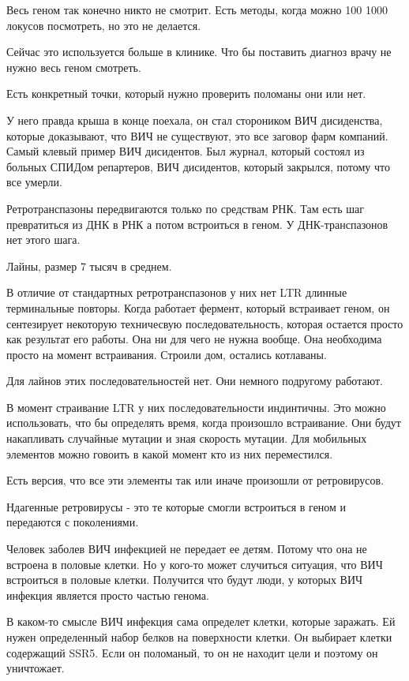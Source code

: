 Весь геном так конечно никто не смотрит. Есть методы, когда 
можно 100 1000 локусов посмотреть, но это не делается. 

Сейчас это используется больше в клинике. Что бы поставить диагноз 
врачу не нужно весь геном смотреть. 

Есть конкретный точки, который нужно проверить поломаны они или нет. 

У него правда крыша в конце поехала, он стал стороником ВИЧ дисиденства, 
которые доказывают, что ВИЧ не существуют, это все заговор фарм компаний. 
Самый клевый пример ВИЧ дисидентов. Был журнал, который состоял из
больных СПИДом репартеров, ВИЧ дисидентов, который закрылся, потому что 
все умерли. 

Ретротранспазоны передвигаются только по средствам РНК. Там есть шаг превратиться
из ДНК в РНК а потом встроиться в геном. У ДНК-транспазонов нет этого шага. 

Лайны, размер 7 тысяч в среднем. 

В отличие от стандартных ретротранспазонов у них нет LTR длинные терминальные повторы. 
Когда работает фермент, который встраивает геном, он сентезирует некоторую 
техничесвую последовательность, которая остается просто как результат его работы. 
Она ни для чего не нужна вообще. Она необходима просто на момент встраивания. Строили дом, остались 
котлаваны. 

Для лайнов этих последовательностей нет. Они немного подругому работают. 

В момент страивание LTR у них последовательности индинтичны. Это можно 
использовать, что бы определять время, когда произошло встраивание. 
Они будут накапливать случайные мутации и зная скорость мутации. 
Для мобильных элементов можно 
говоить в какой момент кто из них 
переместился. 

Есть версия, что все эти элементы так или иначе произошли от ретровирусов.

Ндагенные ретровирусы - это те которые смогли встроиться в геном и передаются с поколениями. 

Человек заболев ВИЧ инфекцией не передает ее детям. Потому что она не встроена в половые клетки. 
Но у кого-то может случиться ситуация, что ВИЧ встроиться в половые клетки. Получится что будут 
люди, у которых ВИЧ инфекция является просто частью генома. 

В каком-то смысле ВИЧ инфекция сама определет клетки, которые заражать. Ей нужен определенный 
набор белков на поверхности клетки. Он выбирает клетки содержащий SSR5. Если он поломаный, то 
он не находит цели и поэтому он уничтожает. 

